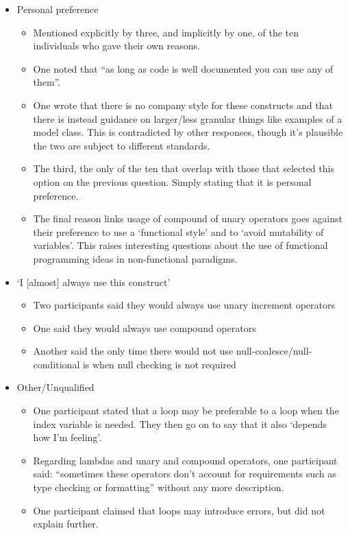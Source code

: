 \documentclass{article}
\begin{document}
            \begin{itemize}
                \item Personal preference
                \begin{itemize}
                    \item Mentioned explicitly by three, and implicitly by one, of the ten individuals who gave their own reasons.
                    \item One noted that ``as long as code is well documented you can use any of them''.
                    \item One wrote that there is no company style for these constructs and that there is instead guidance on larger/less granular things like examples of a model class. This is contradicted by other responses, though it's plausible the two are subject to different standards.
                    \item The third, the only of the ten that overlap with those that selected this option on the previous question. Simply stating that it is personal preference.
                    \item The final reason links usage of compound of unary operators goes against their preference to use a `functional style' and to `avoid mutability of variables'. This raises interesting questions about the use of functional programming ideas in non-functional paradigms.
                \end{itemize}
                \item `I [almost] always use this construct'
                \begin{itemize}
                    \item Two participants said they would always use unary increment operators
                    \item One said they would always use compound operators
                    \item Another said the only time there would not use null-coalesce/null-conditional is when null checking is not required
                \end{itemize}
                \item Other/Unqualified
                \begin{itemize}
                    \item One participant stated that a  loop may be preferable to a  loop when the index variable is needed. They then go on to say that it also `depends how I'm feeling'.
                    \item Regarding lambdas and unary and compound operators, one participant said: ``sometimes these operators don't account for requirements such as type checking or formatting'' without any more description.
                    \item One participant claimed that  loops may introduce errors, but did not explain further.
                \end{itemize}
            \end{itemize}
\end{document}
